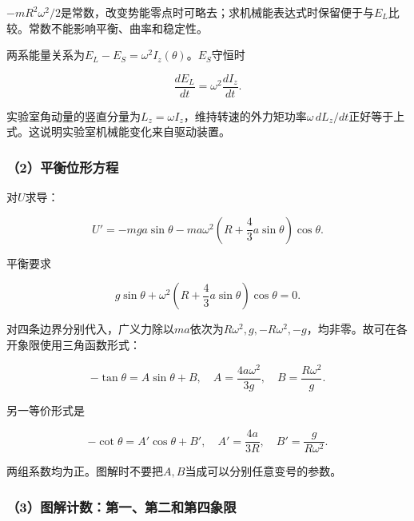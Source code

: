 \documentclass[12pt,a4paper,fontset=fandol]{ctexart}
\begin{document}
\(-mR^2\omega^2/2\)是常数，改变势能零点时可略去；求机械能表达式时保留便于与\(E_L\)比较。常数不能影响平衡、曲率和稳定性。

两系能量关系为\(E_L-E_S=\omega^2I_z(\theta)\)。\(E_S\)守恒时

\[
\frac{dE_L}{dt}=\omega^2\frac{dI_z}{dt}.
\]

实验室角动量的竖直分量为\(L_z=\omega I_z\)，维持转速的外力矩功率\(\omega\,dL_z/dt\)正好等于上式。这说明实验室机械能变化来自驱动装置。

\subsubsection{（2）平衡位形方程}\label{ux5e73ux8861ux4f4dux5f62ux65b9ux7a0b}

对\(U\)求导：

\[
U'=-mga\sin\theta
-ma\omega^2\left(R+\frac43a\sin\theta\right)\cos\theta.
\]

平衡要求

\[
\boxed{
g\sin\theta+\omega^2
\left(R+\frac43a\sin\theta\right)\cos\theta=0}.
\]

对四条边界分别代入，广义力除以\(ma\)依次为\(R\omega^2,g,-R\omega^2,-g\)，均非零。故可在各开象限使用三角函数形式：

\[
-\tan\theta=A\sin\theta+B,\quad
A=\frac{4a\omega^2}{3g},\quad B=\frac{R\omega^2}{g}.
\]

另一等价形式是

\[
-\cot\theta=A'\cos\theta+B',\quad
A'=\frac{4a}{3R},\quad B'=\frac{g}{R\omega^2}.
\]

两组系数均为正。图解时不要把\(A,B\)当成可以分别任意变号的参数。

\subsubsection{（3）图解计数：第一、第二和第四象限}\label{ux56feux89e3ux8ba1ux6570ux7b2cux4e00ux7b2cux4e8cux548cux7b2cux56dbux8c61ux9650}
\end{document}
